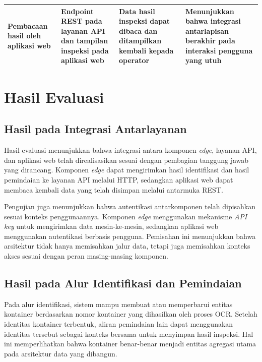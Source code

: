 \begin{table}[ht]
\begin{tabular}{p{} p{} p{} p{}}
        Pembacaan hasil oleh aplikasi web & Endpoint REST pada layanan API dan tampilan inspeksi pada aplikasi web & Data hasil inspeksi dapat dibaca dan ditampilkan kembali kepada operator & Menunjukkan bahwa integrasi antarlapisan berakhir pada interaksi pengguna yang utuh \\
        \bottomrule
    \end{tabular}
\end{table}

\section{Hasil Evaluasi}
\label{sec:hasil-evaluasi}

\subsection{Hasil pada Integrasi Antarlayanan}
\label{subsec:hasil-integrasi-antarlayanan}

Hasil evaluasi menunjukkan bahwa integrasi antara komponen \textit{edge},
layanan API, dan aplikasi web telah direalisasikan sesuai dengan pembagian
tanggung jawab yang dirancang. Komponen \textit{edge} dapat mengirimkan hasil
identifikasi dan hasil pemindaian ke layanan API melalui HTTP, sedangkan
aplikasi web dapat membaca kembali data yang telah disimpan melalui antarmuka
REST.

Pengujian juga menunjukkan bahwa autentikasi antarkomponen telah dipisahkan
sesuai konteks penggunaannya. Komponen \textit{edge} menggunakan mekanisme
\textit{API key} untuk mengirimkan data mesin-ke-mesin, sedangkan aplikasi web
menggunakan autentikasi berbasis pengguna. Pemisahan ini menunjukkan bahwa
arsitektur tidak hanya memisahkan jalur data, tetapi juga memisahkan konteks
akses sesuai dengan peran masing-masing komponen.

\subsection{Hasil pada Alur Identifikasi dan Pemindaian}
\label{subsec:hasil-identifikasi-pemindaian}

Pada alur identifikasi, sistem mampu membuat atau memperbarui entitas kontainer
berdasarkan nomor kontainer yang dihasilkan oleh proses OCR. Setelah identitas
kontainer terbentuk, aliran pemindaian lain dapat menggunakan identitas tersebut
sebagai konteks bersama untuk menyimpan hasil inspeksi. Hal ini memperlihatkan
bahwa kontainer benar-benar menjadi entitas agregasi utama pada arsitektur data
yang dibangun.

